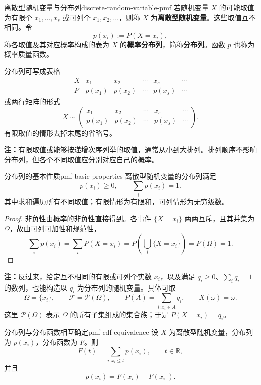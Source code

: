 \begin{mydefinition}{离散型随机变量与分布列}{discrete-random-variable-pmf}
若随机变量 $X$ 的可能取值为有限个 $x_1,\ldots,x_s$ 或可列个 $x_1,x_2,\ldots$，则称 $X$ 为\textbf{离散型随机变量}。这些取值互不相同。令
\[
p(x_i):=P(X=x_i),
\]
称各取值及其对应概率构成的表为 $X$ 的\textbf{概率分布列}，简称\textbf{分布列}。函数 $p$ 也称为概率质量函数。

分布列可写成表格
\[
\begin{array}{c|ccccc}
X&x_1&x_2&\cdots&x_s&\cdots\\ \hline
P&p(x_1)&p(x_2)&\cdots&p(x_s)&\cdots
\end{array}
\]
或两行矩阵的形式
\[
X\sim
\begin{pmatrix}
x_1&x_2&\cdots&x_s&\cdots\\
p(x_1)&p(x_2)&\cdots&p(x_s)&\cdots
\end{pmatrix}.
\]
有限取值的情形去掉末尾的省略号。
\end{mydefinition}

\textbf{注：}\quad 有限取值或能够按递增次序列举的取值，通常从小到大排列。排列顺序不影响分布列，但各个不同取值应分别对应自己的概率。

\begin{proposition}{分布列的基本性质}{pmf-basic-properties}
离散型随机变量的分布列满足
\[
p(x_i)\geq0,\qquad \sum_i p(x_i)=1.
\]
其中求和遍历所有不同取值；有限情形为有限和，可列情形为无穷级数。
\end{proposition}

\begin{proof}
非负性由概率的非负性直接得到。各事件 $\{X=x_i\}$ 两两互斥，且其并集为 $\Omega$，故由可列可加性和规范性，
\[
\sum_i p(x_i)=\sum_iP(X=x_i)
=P\left(\bigcup_i\{X=x_i\}\right)=P(\Omega)=1.
\]
\end{proof}

\textbf{注：}\quad 反过来，给定互不相同的有限或可列个实数 $x_i$，以及满足 $q_i\geq0$、$\sum_iq_i=1$ 的数列，也能构造以 $q_i$ 为分布列的随机变量。具体可取
\[
\Omega=\{x_i\},\qquad
\mathscr F=\mathcal P(\Omega),\qquad
P(A)=\sum_{i:x_i\in A}q_i,\qquad
X(\omega)=\omega.
\]
这里 $\mathcal P(\Omega)$ 表示 $\Omega$ 的所有子集组成的集合族；于是 $P(X=x_i)=q_i$。
\newpage
\begin{proposition}{分布列与分布函数相互确定}{pmf-cdf-equivalence}
设 $X$ 为离散型随机变量，分布列为 $p(x_i)$，分布函数为 $F$。则
\[
F(t)=\sum_{i:x_i\leq t}p(x_i),\qquad t\in\mathbb R,
\]
并且
\[
p(x_i)=F(x_i)-F(x_i^-).
\]
\end{proposition}

